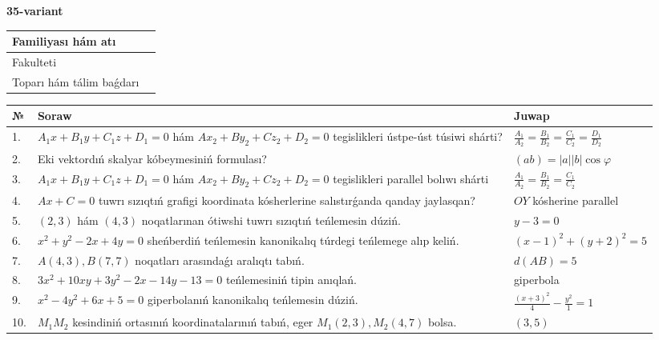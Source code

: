 \documentclass{article}
\begin{document}
\egroup

\newpage


\textbf{35-variant}\\

\bgroup
\def\arraystretch{1.6} %

\begin{tabular}{|m{5.7cm}|m{9.5cm}|}
\hline
Familiyası hám atı & \\
\hline
Fakulteti  & \\
\hline
Toparı hám tálim baǵdarı  & \\
\hline
\end{tabular}

\vspace{1cm}

\begin{tabular}{|m{0.7cm}|m{10cm}|m{4cm}|}
\hline
№ & Soraw & Juwap \\
\hline
1. & $A_1x+B_1y+C_1z+D_1=0$ hám $Ax_2+By_2+Cz_2+D_2=0$ tegislikleri ústpe-úst túsiwi shárti? & $\frac{A_1}{A_2}=\frac{B_1}{B_2}=\frac{C_1}{C_2}=\frac{D_1}{D_2}$ \\
\hline
2. & Eki vektordıń skalyar kóbeymesiniń formulası? & $(ab)=|a||b|\cos\varphi$ \\
\hline
3. & $A_1x+B_1y+C_1z+D_1=0$ hám $Ax_2+By_2+Cz_2+D_2=0$ tegislikleri parallel bolıwı shárti & $\frac{A_1}{A_2}=\frac{B_1}{B_2}=\frac{C_1}{C_2}$ \\
\hline
4. & $Ax+C=0$ tuwrı sızıqtıń grafigi koordinata kósherlerine salıstırǵanda qanday jaylasqan? & $OY$ kósherine parallel \\
\hline
5. & $(2, 3)$ hám $(4, 3)$ noqatlarınan ótiwshi tuwrı sızıqtıń teńlemesin dúziń. & $ y-3=0$ \\
\hline
6. & $x^{2}+y^{2}-2x+4y=0$ sheńberdiń teńlemesin kanonikalıq túrdegi teńlemege alıp keliń. & $(x-1)^{2}+(y+2)^{2}=5$ \\
\hline
7. & $A(4, 3), B(7, 7)$ noqatları arasındaǵı aralıqtı tabıń. & $d(AB)=5$ \\
\hline
8. & $3x^{2}+10xy+3y^{2}-2x-14y-13=0$ teńlemesiniń tipin anıqlań. & giperbola \\
\hline
9. & $x^{2}-4y^{2}+6x+5=0$ giperbolanıń kanonikalıq teńlemesin dúziń. & $\frac{(x+3)^{2}}{4}-\frac{y^{2}}{1}=1$ \\
\hline
10. & $M_{1}M_{2}$ kesindiniń ortasınıń koordinatalarınıń tabıń, eger $M_{1} (2, 3), M_{2} (4, 7)$ bolsa. & $(3,5)$ \\
\hline
\end{tabular}
\end{document}
